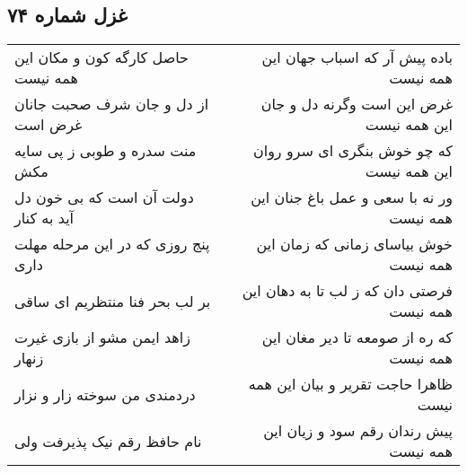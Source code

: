 \begin{center}
\section*{غزل شماره ۷۴}
\label{sec:sh074}
\begin{longtable}{l p{0.5cm} r}
حاصل کارگه کون و مکان این همه نیست
&&
باده پیش آر که اسباب جهان این همه نیست
\\
از دل و جان شرف صحبت جانان غرض است
&&
غرض این است وگرنه دل و جان این همه نیست
\\
منت سدره و طوبی ز پی سایه مکش
&&
که چو خوش بنگری ای سرو روان این همه نیست
\\
دولت آن است که بی خون دل آید به کنار
&&
ور نه با سعی و عمل باغ جنان این همه نیست
\\
پنج روزی که در این مرحله مهلت داری
&&
خوش بیاسای زمانی که زمان این همه نیست
\\
بر لب بحر فنا منتظریم ای ساقی
&&
فرصتی دان که ز لب تا به دهان این همه نیست
\\
زاهد ایمن مشو از بازی غیرت زنهار
&&
که ره از صومعه تا دیر مغان این همه نیست
\\
دردمندی من سوخته زار و نزار
&&
ظاهرا حاجت تقریر و بیان این همه نیست
\\
نام حافظ رقم نیک پذیرفت ولی
&&
پیش رندان رقم سود و زیان این همه نیست
\\
\end{longtable}
\end{center}
